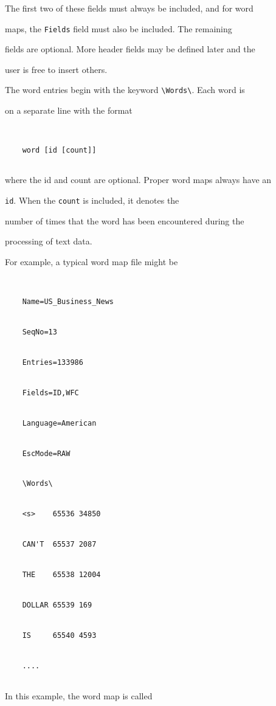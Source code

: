 The first two of these fields must always be included, and for word


maps, the \texttt{Fields} field must also be included.  The remaining


fields are optional.  More header fields may be defined later and the


user is free to insert others.





The word entries begin with the keyword \verb+\Words\+.  Each word is


on a separate line with the format


\begin{verbatim}


    word [id [count]]


\end{verbatim}


where the id and count are optional. Proper word maps always have an


\texttt{id}.  When the \texttt{count} is included, it denotes the


number of times that the word has been encountered during the


processing of text data.





For example, a typical word map file might be


\begin{verbatim}


    Name=US_Business_News


    SeqNo=13


    Entries=133986


    Fields=ID,WFC


    Language=American


    EscMode=RAW


    \Words\


    <s>    65536 34850


    CAN'T  65537 2087


    THE    65538 12004


    DOLLAR 65539 169


    IS     65540 4593


    ....


\end{verbatim}


In this example, the word map is called


